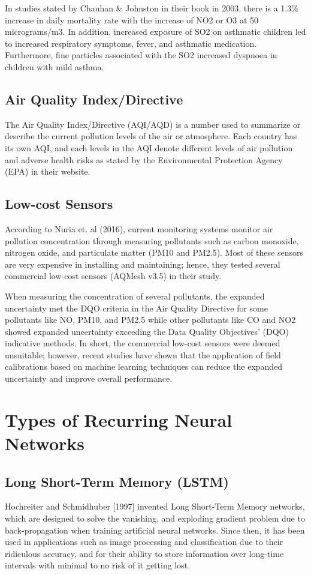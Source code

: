 \documentclass[10pt,11pt,12pt,oneside]{book}
\begin{document}
        In studies stated by Chauhan \& Johnston in their book in 2003, there is a 1.3\% increase in daily mortality rate with the increase of NO2 or O3 at 50 micrograms/m3. In addition, increased exposure of SO2 on asthmatic children led to increased respiratory symptoms, fever, and asthmatic medication. Furthermore, fine particles associated with the SO2 increased dyspnoea in children with mild asthma. \cite{doi:10.1093/bmb/ldg022}
        \subsection{Air Quality Index/Directive}
        The Air Quality Index/Directive (AQI/AQD) is a number used to summarize or describe the current pollution levels of the air or atmosphere. Each country has its own AQI, and each levels in the AQI denote different levels of air pollution and adverse health risks as stated by the Environmental Protection Agency (EPA) in their website. \cite{airbasics}
        \subsection{Low-cost Sensors}
        According to Nuria et. al (2016), current monitoring systems monitor air pollution concentration through measuring pollutants such as carbon monoxide, nitrogen oxide, and particulate matter (PM10 and PM2.5). Most of these sensors are very expensive in installing and maintaining; hence, they tested several commercial low-cost sensors (AQMesh v3.5) in their study.

        When measuring the concentration of several pollutants, the expanded uncertainty met the DQO criteria in the Air Quality Directive for some pollutants like NO, PM10, and PM2.5 while other pollutants like CO and NO2 showed expanded uncertainty exceeding the Data Quality Objectives’ (DQO) indicative methods. In short, the commercial low-cost sensors were deemed unsuitable; however, recent studies have shown that the application of field calibrations based on machine learning techniques can reduce the expanded uncertainty and improve overall performance. \cite{Castell2017}
    \section{Types of Recurring Neural Networks}
        \subsection{Long Short-Term Memory (LSTM)}
        Hochreiter and Schmidhuber [1997] invented Long Short-Term Memory networks, which are designed to solve the vanishing, and exploding gradient problem due to back-propagation when training artificial neural networks. Since then, it has been used in applications such as image processing and classification due to their ridiculous accuracy, and for their ability to store information over long-time intervals with minimal to no risk of it getting lost. \cite{Hochreiter:1997:LSM:1246443.1246450}
\end{document}
